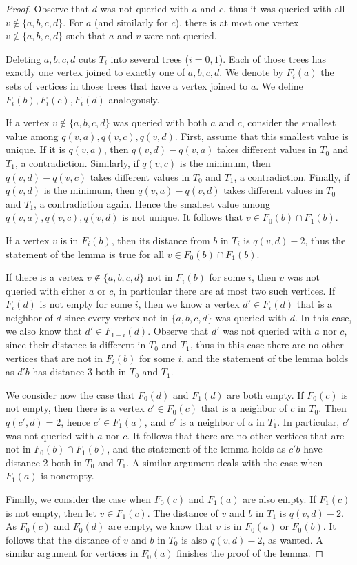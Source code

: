\documentclass[12pt,a4paper]{amsart}
\theoremstyle{plain}
\theoremstyle{definition}
\begin{document}
\begin{proof} 
Observe that $d$ was not queried with $a$ and $c$, thus it was queried with all $v\not\in \{a,b,c,d\}$. For $a$ (and similarly for $c$), there is at most one vertex $v \notin\{a,b,c,d\}$ such that $a$ and $v$ were not queried. 

Deleting $a,b,c,d$ cuts $T_i$ into several trees ($i=0,1$). Each of those trees has exactly one vertex joined to exactly one of $a,b,c,d$. We denote by $F_i(a)$ the sets of vertices in those trees that have a vertex joined to $a$. We define $F_i(b),F_i(c),F_i(d)$ analogously. 

If a vertex $v\not\in \{a,b,c,d\}$ was queried with both $a$ and $c$, consider the smallest value among $q(v,a),q(v,c),q(v,d)$. First, assume that this smallest value is unique. If it is $q(v,a)$, then $q(v,d)-q(v,a)$ takes different values in $T_0$ and $T_1$, a contradiction. Similarly, if $q(v,c)$ is the minimum, then $q(v,d)-q(v,c)$ takes different values in $T_0$ and $T_1$, a contradiction. Finally, if $q(v,d)$ is the minimum, then $q(v,a)-q(v,d)$ takes different values in $T_0$ and $T_1$, a contradiction again. Hence the smallest value among $q(v,a),q(v,c),q(v,d)$ is not unique. It follows that $v\in F_0(b)\cap F_1(b)$.
    
If a vertex $v$ is in $F_i(b)$, then its distance from $b$ in $T_i$ is $q(v,d)-2$, thus the statement of the lemma is true for all $v \in F_0(b)\cap F_1(b)$. 

If there is a vertex $v\not\in \{a,b,c,d\}$ not in $F_i(b)$ for some $i$, then $v$ was not queried with either $a$ or $c$, in particular there are at most two such vertices. If $F_i(d)$ is not empty for some $i$, then we know a vertex $d'\in F_i(d)$ that is a neighbor of $d$ since every vertex not in $ \{a,b,c,d\}$ was queried with $d$. In this case, we also know that $d' \in F_{1-i}(d)$.
 Observe that $d'$ was not queried with $a$ nor $c$, since their distance is different in $T_0$ and $T_1$, thus in this case there are no other vertices that are not in $F_i(b)$ for some $i$, and the statement of the lemma holds as $d'b$ has distance 3 both in $T_0$ and $T_1$.
 
 We consider now the case that $F_0(d)$ and $F_1(d)$ are both empty.
 If $F_0(c)$ is not empty, then there is a vertex $c'\in F_0(c)$ that is a neighbor of $c$ in $T_0$. Then $q(c',d)=2$, hence $c'\in F_1(a)$, and $c'$ is a neighbor of $a$ in $T_1$. In particular, $c'$ was not queried with $a$ nor $c$. It follows that there are no other vertices that are not in $F_0(b) \cap F_1(b)$, and the statement of the lemma holds as $c'b$ have distance 2 both in $T_0$ and $T_1$. A similar argument deals with the case when $F_1(a)$ is nonempty. 

Finally, we consider the case when $F_0(c)$ and $F_1(a)$ are also empty. 
If $F_1(c)$ is not empty, then let $v\in F_1(c)$. The distance of $v$ and $b$ in $T_1$ is $q(v,d)-2$. As $F_0(c)$ and $F_0(d)$ are empty, we know that $v$ is in $F_0(a)$ or $F_0(b)$. It follows that the distance of $v$ and $b$ in $T_0$ is also $q(v,d)-2$, as wanted. A similar argument for vertices in $F_0(a)$ finishes the proof of the lemma.
\end{proof} 
\end{document}
